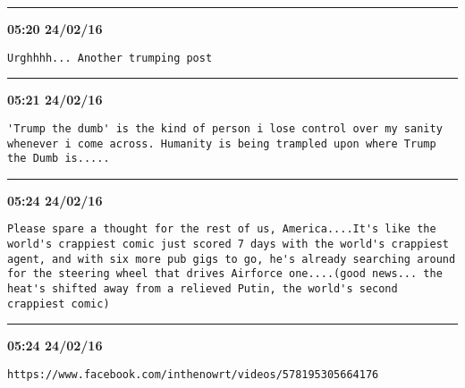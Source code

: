 \hrule%

\begin{adjustwidth}{0cm}{0cm}
\footnotesize \textbf{05:20 24/02/16}

\begin{lstlisting}[breaklines, breakatwhitespace, basicstyle=\small, frame=leftline]
Urghhhh... Another trumping post
\end{lstlisting}
\end{adjustwidth}

\hrule%

\begin{adjustwidth}{0cm}{0cm}
\footnotesize \textbf{05:21 24/02/16}

\begin{lstlisting}[breaklines, breakatwhitespace, basicstyle=\small, frame=leftline]
'Trump the dumb' is the kind of person i lose control over my sanity whenever i come across. Humanity is being trampled upon where Trump the Dumb is.....
\end{lstlisting}
\end{adjustwidth}

\hrule%

\begin{adjustwidth}{0cm}{0cm}
\footnotesize \textbf{05:24 24/02/16}

\begin{lstlisting}[breaklines, breakatwhitespace, basicstyle=\small, frame=leftline]
Please spare a thought for the rest of us, America....It's like the world's crappiest comic just scored 7 days with the world's crappiest agent, and with six more pub gigs to go, he's already searching around for the steering wheel that drives Airforce one....(good news... the heat's shifted away from a relieved Putin, the world's second crappiest comic)
\end{lstlisting}
\end{adjustwidth}

\hrule%

\begin{adjustwidth}{0cm}{0cm}
\footnotesize \textbf{05:24 24/02/16}

\begin{lstlisting}[breaklines, breakatwhitespace, basicstyle=\small, frame=leftline]
https://www.facebook.com/inthenowrt/videos/578195305664176
\end{lstlisting}
\end{adjustwidth}

